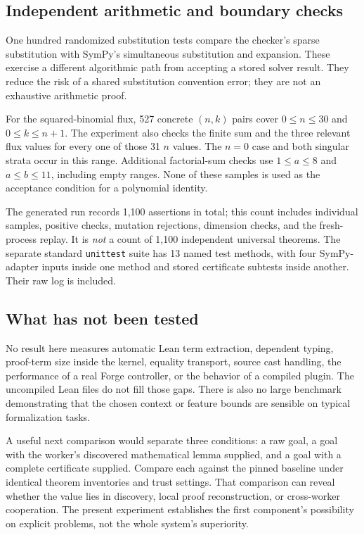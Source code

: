 \documentclass[11pt,letterpaper]{article}
\newcommand{\code}[1]{\texttt{#1}}
\theoremstyle{definition}\newtheorem{definition}[theorem]{Definition}
\theoremstyle{remark}\newtheorem{remark}[theorem]{Remark}
\begin{document}
\subsection{Independent arithmetic and boundary checks}
One hundred randomized substitution tests compare the checker's sparse
substitution with SymPy's simultaneous substitution and expansion. These
exercise a different algorithmic path from accepting a stored solver result.
They reduce the risk of a shared substitution convention error; they are not
an exhaustive arithmetic proof.

For the squared-binomial flux, 527 concrete $(n,k)$ pairs cover
$0\le n\le30$ and $0\le k\le n+1$. The experiment also checks the finite sum
and the three relevant flux values for every one of those 31 $n$ values.
The $n=0$ case and both singular strata occur in this range. Additional
factorial-sum checks use $1\le a\le8$ and $a\le b\le11$, including empty
ranges. None of these samples is used as the acceptance condition for a
polynomial identity.

The generated run records 1,100 assertions in total; this count includes
individual samples, positive checks, mutation rejections, dimension checks,
and the fresh-process replay. It is \emph{not} a count of 1,100 independent
universal theorems. The separate standard \code{unittest} suite has 13 named
test methods, with four SymPy-adapter inputs inside one method and stored
certificate subtests inside another. Their raw log is included.

\subsection{What has not been tested}
No result here measures automatic Lean term extraction, dependent typing,
proof-term size inside the kernel, equality transport, source cast handling,
the performance of a real Forge controller, or the behavior of a compiled
\grind{} plugin. The uncompiled Lean files do not fill those gaps.
There is also no large benchmark demonstrating that the chosen context or
feature bounds are sensible on typical formalization tasks.

A useful next comparison would separate three conditions: a raw goal, a goal
with the worker's discovered mathematical lemma supplied, and a goal with a
complete certificate supplied. Compare each against the pinned baseline under
identical theorem inventories and trust settings. That comparison can reveal
whether the value lies in discovery, local proof reconstruction, or cross-worker
cooperation. The present experiment establishes the first component's
possibility on explicit problems, not the whole system's superiority.
\end{document}
